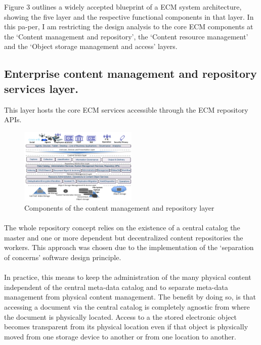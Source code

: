 \documentclass[EPiC]{easychair} %
\begin{document}
Figure 3 outlines a widely accepted blueprint of a ECM system architecture, showing the five layer and the respective functional components in that layer. In this pa-per, I am restricting the design analysis to the core ECM components at the ‘Content management and repository’, the ‘Content resource management’ and the ‘Object storage management and access’ layers.

\subsection{Enterprise content management and repository services layer. }

This layer hosts the core ECM services accessible through the ECM repository APIs. 

\begin{figure}[hbt!]
	\begin{centering}
	\includegraphics[width=0.5\textwidth]{pics/ECMpic04}
	\caption{Components of the content management and repository layer}
	\label{fig:ecm-components}
	\end{centering}
\end{figure}

\paragraph{} The whole repository concept relies on the existence of a central catalog the master and one or more dependent but decentralized content repositories the workers. This approach was chosen due to the implementation of the ‘separation of concerns’ software design principle. 

\paragraph{} In practice, this means to keep the administration of the many physical content independent of the central meta-data catalog and to separate meta-data management from physical content management. The benefit by doing so, is that accessing a document via the central catalog is completely agnostic from where the document is physically located. Access to a the stored electronic object becomes transparent from its physical location even if that object is physically moved from one storage device to another or from one location to another. 
\end{document}

